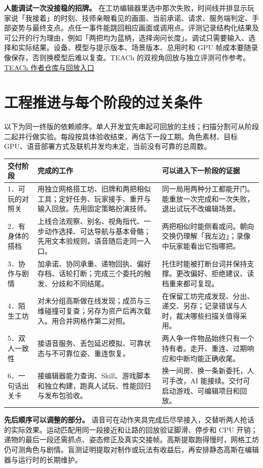 \documentclass[UTF8,11pt,fontset=fandol,a4paper]{ctexart}
\newcommand{\src}[2]{\href{#1}{#2}}
\newcommand{\page}[1]{\clearpage\section{#1}}
\begin{document}
\textbf{人能调试一次没接稳的招牌。} 在工坊编辑器里选中那次失败，时间线并排显示玩家说「我接着」的时刻、技师亲眼看见的画面、当前承诺、请求、服务端判定、手部姿势与最终支点。点任一事件能跳回相应画面或调用点。评测记录结构化结果及可公开的行为理由，例如「两把均为蓝柄，选择询问长度」。调试只需要输入、选择和实际结果。设备、模型与提示版本、场景版本、总用时和 GPU 帧成本要随录像保存，否则换模型后难以复查。TEACh 的双视角回放与独立评测可作参考。\src{https://github.com/alexa/teach}{TEACh 作者仓库与回放入口}

\page{工程推进与每个阶段的过关条件}
以下为同一终版的依赖顺序。单人开发宜先串起可回放的主线；扫描分割可从阶段二起并行做实验。每段按具体验收结束，再估下一段工期。角色素材、目标 GPU、语音部署方式及联机并发均未定，当前没有可靠的总周数。

\begin{center}\small
\begin{tabularx}{\linewidth}{@{}L{24mm}YY@{}}\toprule
交付阶段 & 完成的工作 & 可以进入下一阶段的证据\\．可玩的对照关 & 用独立网格搭工坊、旧牌和两把相似工具；定好任务、玩家接手、重开与输入回放。先用固定策略扮演技师。 & 同一局用两种分工都能开门。能重放一次完成和一次失败，退出试玩不改编辑场景。\\
2．有身体的搭档 & 上线合法观察、别名、视角指代、一步动作选择、可达导航与基本骨骼；先用文本验规则，语音随后走同一入口。 & 两把相似时能侧看或问。朝向交换仍理解「我左边」；录像中玩家能看出它指哪把。\\
3．协作与剧情 & 加承诺、协同承重、递物回执、偏好存档、话轮打断；完成三个委托的触发、分歧和不同结尾。 & 托住时能被打断台词并保持支撑。更改偏好、拒绝建议、读档重来都可复现。\\
4．陌生工坊 & 对未分组高斯做在线发现；成员与三维碰撞可复查；另存为资产后再次载入。用合并网格作第二对照。 & 在保留工坊完成发现、分出、递交、另存；记录错误与人时，裁决哪些扫描关值得采用。\\
5．双人一致性 & 接语音服务、丢包延迟模拟、可靠状态与不可靠位姿、重连恢复。 & 两人争一件物品始终只有一个持有者。走开、重连、过期响应和中断均能正确收尾。\\
6．一句话出关卡 & 接编辑器能力查询、Skill、游戏脚本和独立构建，跑真人试玩、性能回归与发布包验收。 & 换一间房、换一条新委托，人可手改，AI 能接续。交付可启动游戏、可编辑项目和回放。\\\bottomrule
\end{tabularx}
\end{center}

\textbf{先后顺序可以调整的部分。} 语音可在动作夹具完成后尽早接入，交替听两人抢话的实际效果。运动匹配用同一段接近和让路的回放验证脚滑、停步和 CPU 开销；递物的最后一段还需抓点、姿态修正及真实交接帧。高斯提取跑得慢时，网格工坊仍可测角色与剧情。盲测证明提取对制作或玩法有收益后，再安排静态高斯在编辑器与运行时的长期维护。
\end{document}
